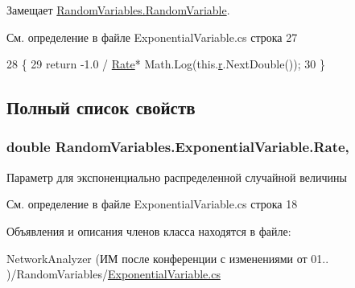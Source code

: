 Замещает \hyperlink{class_random_variables_1_1_random_variable_adf5ef829531ebcc4f0591b81d579519a}{Random\+Variables.\+Random\+Variable}.



См. определение в файле Exponential\+Variable.\+cs строка 27


\begin{DoxyCode}
28         \{
29             \textcolor{keywordflow}{return} -1.0 / \hyperlink{class_random_variables_1_1_exponential_variable_a158140032c03acf367981db02dde135a}{Rate}* Math.Log(this.\hyperlink{class_random_variables_1_1_random_variable_a8a79eb7a1676b85b74906831b2850cb9}{r}.NextDouble());
30         \}
\end{DoxyCode}


\subsection{Полный список свойств}
\subsubsection[{\texorpdfstring{Rate}{Rate}}]{\setlength{\rightskip}{0pt plus 5cm}double Random\+Variables.\+Exponential\+Variable.\+Rate\hspace{0.3cm}{\ttfamily [get]}, {\ttfamily [set]}}\hypertarget{class_random_variables_1_1_exponential_variable_a158140032c03acf367981db02dde135a}{}\label{class_random_variables_1_1_exponential_variable_a158140032c03acf367981db02dde135a}


Параметр для экспоненциально распределенной случайной величины 



См. определение в файле Exponential\+Variable.\+cs строка 18



Объявления и описания членов класса находятся в файле\+:\begin{DoxyCompactItemize}
\item 
Network\+Analyzer (ИМ после конференции  с изменениями от 01.. )/\+Random\+Variables/\hyperlink{_exponential_variable_8cs}{Exponential\+Variable.\+cs}\end{DoxyCompactItemize}
